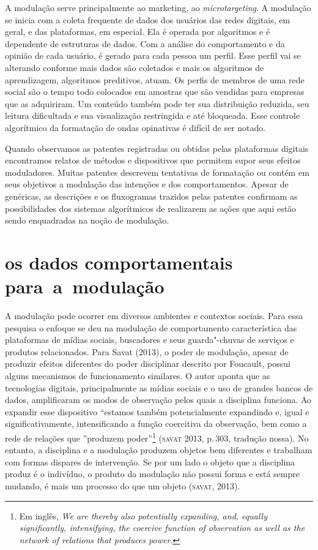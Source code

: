 A modulação serve principalmente ao marketing, ao \textit{microtargeting}.
A modulação se inicia com a coleta frequente de dados dos usuários das
redes digitais, em geral, e das plataformas, em especial. Ela é operada
por algoritmos e é dependente de estruturas de dados. Com a análise do
comportamento e da opinião de cada usuário, é gerado para cada pessoa um
perfil. Esse perfil vai se alterando conforme mais dados são coletados e
mais os algoritmos de aprendizagem, algoritmos preditivos, atuam. Os
perfis de membros de uma rede social são o tempo todo colocados em
amostras que são vendidas para empresas que as adquiriram. Um conteúdo
também pode ter sua distribuição reduzida, seu leitura dificultada e sua
visualização restringida e até bloqueada. Esse controle algorítmico da
formatação de ondas opinativas é difícil de ser notado.

Quando observamos as patentes registradas ou obtidas pelas plataformas
digitais encontramos relatos de métodos e dispositivos que permitem
supor seus efeitos moduladores. Muitas patentes descrevem tentativas de
formatação ou contém em seus objetivos a modulação das intenções e dos
comportamentos. Apesar de genéricas, as descrições e os fluxogramas
trazidos pelas patentes confirmam as possibilidades dos sistemas
algorítmicos de realizarem as ações que aqui estão sendo enquadradas na
noção de modulação.

\section{os dados comportamentais para~a~modulação}

A modulação pode ocorrer em diversos ambientes e contextos sociais. Para
essa pesquisa o enfoque se deu na modulação de comportamento
característica das plataformas de mídias sociais, buscadores e seus
guarda"-chuvas de serviços e produtos relacionados. Para Savat (2013), o
poder de modulação, apesar de produzir efeitos diferentes do poder
disciplinar descrito por Foucault, possui alguns mecanismos de
funcionamento similares. O autor aponta que as tecnologias digitais,
principalmente as mídias sociais e o uso de grandes bancos de dados,
amplificaram os modos de observação pelos quais a disciplina funciona.
Ao expandir esse dispositivo ``estamos também potencialmente expandindo
e, igual e significativamente, intensificando a função coercitiva da
observação, bem como a rede de relações que ''produzem poder''\footnote{Em inglês, \textit{We
  are thereby also potentially expanding, and, equally significantly,
  intensifying, the coercive function of observation as well as the
  network of relations that \textit{produces power}}.} (\textsc{savat} 2013, p.\,303,
tradução nossa). No entanto, a disciplina e a modulação produzem objetos
bem diferentes e trabalham com formas dispares de intervenção. Se por um
lado o objeto que a disciplina produz é o indivíduo, o produto da
modulação não possui forma e está sempre mudando, é mais um processo do
que um objeto (\textsc{savat}, 2013).

